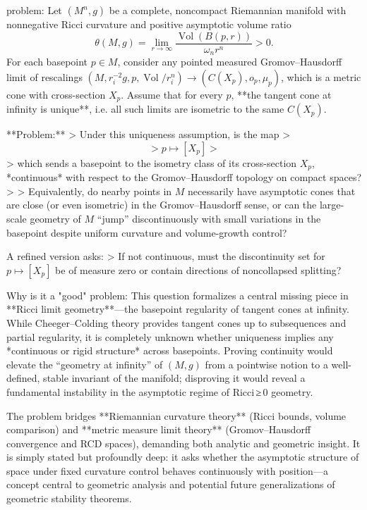 problem:  
Let \((M^n,g)\) be a complete, noncompact Riemannian manifold with nonnegative Ricci curvature and positive asymptotic volume ratio
\[
\theta(M,g)=\lim_{r\to\infty}\frac{\operatorname{Vol}(B(p,r))}{\omega_n r^n}>0.
\]
For each basepoint \(p\in M\), consider any pointed measured Gromov–Hausdorff limit of rescalings \((M,r_i^{-2}g,p,\operatorname{Vol}/r_i^n)\to (C(X_p),o_p,\mu_p)\), which is a metric cone with cross-section \(X_p\).  
Assume that for every \(p\), **the tangent cone at infinity is unique**, i.e. all such limits are isometric to the same \(C(X_p)\).

**Problem:**  
> Under this uniqueness assumption, is the map
> \[
> p\longmapsto [X_p]
> \]
> which sends a basepoint to the isometry class of its cross-section \(X_p\), *continuous* with respect to the Gromov–Hausdorff topology on compact spaces?  
> 
> Equivalently, do nearby points in \(M\) necessarily have asymptotic cones that are close (or even isometric) in the Gromov–Hausdorff sense, or can the large-scale geometry of \(M\) “jump” discontinuously with small variations in the basepoint despite uniform curvature and volume-growth control?  

A refined version asks:  
> If not continuous, must the discontinuity set for \(p\mapsto [X_p]\) be of measure zero or contain directions of noncollapsed splitting?  

Why is it a "good" problem:  
This question formalizes a central missing piece in **Ricci limit geometry**—the basepoint regularity of tangent cones at infinity. While Cheeger–Colding theory provides tangent cones up to subsequences and partial regularity, it is completely unknown whether uniqueness implies any *continuous or rigid structure* across basepoints. Proving continuity would elevate the “geometry at infinity” of \((M,g)\) from a pointwise notion to a well-defined, stable invariant of the manifold; disproving it would reveal a fundamental instability in the asymptotic regime of Ricci ≥ 0 geometry.  

The problem bridges **Riemannian curvature theory** (Ricci bounds, volume comparison) and **metric measure limit theory** (Gromov–Hausdorff convergence and RCD spaces), demanding both analytic and geometric insight. It is simply stated but profoundly deep: it asks whether the asymptotic structure of space under fixed curvature control behaves continuously with position—a concept central to geometric analysis and potential future generalizations of geometric stability theorems.